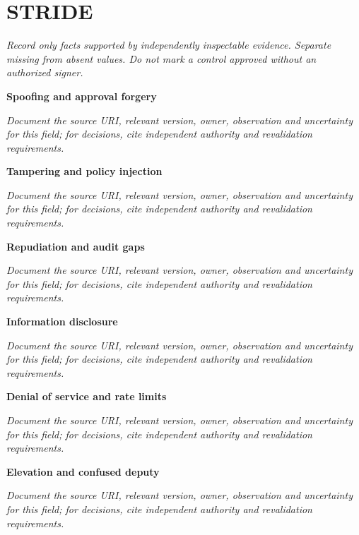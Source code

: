 \documentclass[11pt,letterpaper]{article}
\begin{document}
\section{STRIDE}
\noindent\emph{Record only facts supported by independently inspectable evidence. Separate missing from absent values. Do not mark a control approved without an authorized signer.}\par
\noindent\textbf{Spoofing and approval forgery}\par
\noindent\emph{Document the source URI, relevant version, owner, observation and uncertainty for this field; for decisions, cite independent authority and revalidation requirements.}\par\medskip
\noindent\textbf{Tampering and policy injection}\par
\noindent\emph{Document the source URI, relevant version, owner, observation and uncertainty for this field; for decisions, cite independent authority and revalidation requirements.}\par\medskip
\noindent\textbf{Repudiation and audit gaps}\par
\noindent\emph{Document the source URI, relevant version, owner, observation and uncertainty for this field; for decisions, cite independent authority and revalidation requirements.}\par\medskip
\noindent\textbf{Information disclosure}\par
\noindent\emph{Document the source URI, relevant version, owner, observation and uncertainty for this field; for decisions, cite independent authority and revalidation requirements.}\par\medskip
\noindent\textbf{Denial of service and rate limits}\par
\noindent\emph{Document the source URI, relevant version, owner, observation and uncertainty for this field; for decisions, cite independent authority and revalidation requirements.}\par\medskip
\noindent\textbf{Elevation and confused deputy}\par
\noindent\emph{Document the source URI, relevant version, owner, observation and uncertainty for this field; for decisions, cite independent authority and revalidation requirements.}\par\medskip
\end{document}
